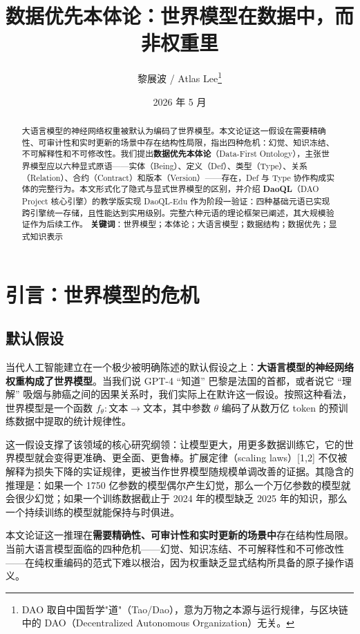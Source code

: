 \documentclass[11pt,a4paper]{ctexart}
\title{数据优先本体论：世界模型在数据中，而非权重里}
\author{黎展波 / Atlas Lee\thanks{DAO  取自中国哲学"道"（Tao/Dao），意为万物之本源与运行规律，与区块链中的  DAO（Decentralized Autonomous Organization）无关。}}
\affil{DAO Project}
\date{2026 年 5 月}
\begin{document}
\maketitle

\begin{abstract}
大语言模型的神经网络权重被默认为编码了世界模型。本文论证这一假设在需要精确性、可审计性和实时更新的场景中存在结构性局限，指出四种危机：幻觉、知识冻结、不可解释性和不可修改性。我们提出\textbf{数据优先本体论}（Data-First
Ontology），主张世界模型应以六种显式原语------实体（Being）、定义（Def）、类型（Type）、关系（Relation）、合约（Contract）和版本（Version）------存在，Def
与 Type
协作构成实体的完整行为。本文形式化了隐式与显式世界模型的区别，并介绍
\textbf{DaoQL}（DAO Project 核心引擎）的教学版实现 DaoQL-Edu
作为阶段一验证：四种基础元语已实现跨引擎统一存储，且性能达到实用级别。完整六种元语的理论框架已阐述，其大规模验证作为后续工作。
\textbf{关键词}：世界模型；本体论；大语言模型；数据结构；数据优先；显式知识表示
\end{abstract}

\section{引言：世界模型的危机}\label{ux5f15ux8a00ux4e16ux754cux6a21ux578bux7684ux5371ux673a}

\subsection{默认假设}\label{ux9ed8ux8ba4ux5047ux8bbe}

当代人工智能建立在一个极少被明确陈述的默认假设之上：\textbf{大语言模型的神经网络权重构成了世界模型}。当我们说
GPT-4 ``知道'' 巴黎是法国的首都，或者说它 ``理解''
吸烟与肺癌之间的因果关系时，我们实际上在默许这一假设。按照这种看法，世界模型是一个函数
\(f_\theta: \text{文本} \rightarrow \text{文本}\)，其中参数 \(\theta\)
编码了从数万亿 token 的预训练数据中提取的统计规律性。

这一假设支撑了该领域的核心研究纲领：让模型更大，用更多数据训练它，它的世界模型就会变得更准确、更全面、更鲁棒。扩展定律（scaling
laws）{[}1,2{]}
不仅被解释为损失下降的实证规律，更被当作世界模型随规模单调改善的证据。其隐含的推理是：如果一个
1750
亿参数的模型偶尔产生幻觉，那么一个万亿参数的模型就会很少幻觉；如果一个训练数据截止于
2024 年的模型缺乏 2025
年的知识，那么一个持续训练的模型就能保持与时俱进。

本文论证这一推理在\textbf{需要精确性、可审计性和实时更新的场景中}存在结构性局限。当前大语言模型面临的四种危机------幻觉、知识冻结、不可解释性和不可修改性------在纯权重编码的范式下难以根治，因为权重缺乏显式结构所具备的原子操作语义。
\end{document}
